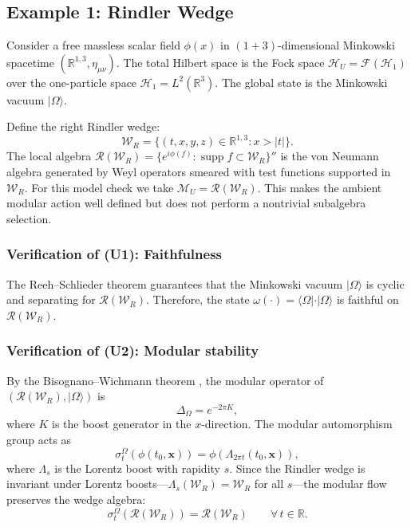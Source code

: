 \documentclass[12pt,a4paper]{article}
\begin{document}
\subsection{Example 1: Rindler Wedge}
\label{sec:rindler}

Consider a free massless scalar field $\phi(x)$ in $(1+3)$-dimensional Minkowski spacetime $(\mathbb{R}^{1,3}, \eta_{\mu\nu})$.
The total Hilbert space is the Fock space $\mathcal{H}_U = \mathcal{F}(\mathcal{H}_1)$ over the one-particle space $\mathcal{H}_1 = L^2(\mathbb{R}^3)$.
The global state is the Minkowski vacuum $|\Omega\rangle$.

Define the right Rindler wedge:
\begin{equation}
\mathcal{W}_R = \{(t, x, y, z) \in \mathbb{R}^{1,3} : x > |t|\}.
\end{equation}
The local algebra $\mathcal{R}(\mathcal{W}_R) = \{e^{i\phi(f)} : \operatorname{supp} f \subset \mathcal{W}_R\}''$ is the von Neumann algebra generated by Weyl operators smeared with test functions supported in $\mathcal{W}_R$.
For this model check we take $\mathcal M_U=\mathcal R(\mathcal W_R)$.  This makes the ambient modular action well defined but does not perform a nontrivial subalgebra selection.

\subsubsection{Verification of (U1): Faithfulness}

The Reeh--Schlieder theorem \cite{Haag1996} guarantees that the Minkowski vacuum $|\Omega\rangle$ is cyclic and separating for $\mathcal{R}(\mathcal{W}_R)$.
Therefore, the state $\omega(\cdot) = \langle\Omega|\cdot|\Omega\rangle$ is faithful on $\mathcal{R}(\mathcal{W}_R)$.

\subsubsection{Verification of (U2): Modular stability}

By the Bisognano--Wichmann theorem \cite{BisognanoWichmann1975, BisognanoWichmann1976}, the modular operator of $(\mathcal{R}(\mathcal{W}_R), |\Omega\rangle)$ is
\begin{equation}
\Delta_\Omega = e^{-2\pi K},
\end{equation}
where $K$ is the boost generator in the $x$-direction.
The modular automorphism group acts as
\begin{equation}
\sigma_t^\Omega(\phi(t_0, \mathbf{x})) = \phi(\Lambda_{2\pi t}(t_0, \mathbf{x})),
\end{equation}
where $\Lambda_s$ is the Lorentz boost with rapidity $s$.
Since the Rindler wedge is invariant under Lorentz boosts---$\Lambda_s(\mathcal{W}_R) = \mathcal{W}_R$ for all $s$---the modular flow preserves the wedge algebra:
\begin{equation}
\sigma_t^\Omega(\mathcal{R}(\mathcal{W}_R)) = \mathcal{R}(\mathcal{W}_R) \qquad \forall\, t \in \mathbb{R}.
\end{equation}
\end{document}
